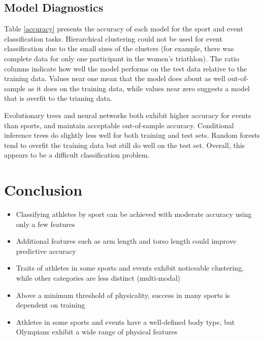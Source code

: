 \documentclass[12pt,letterpaper]{article} %
\begin{document}

\subsection{Model Diagnostics}

Table \ref{accuracy} presents the accuracy of each model for the sport and event classification tasks. Hierarchical clustering could not be used for event classification due to the small sizes of the clusters (for example, there was complete data for only one participant in the women's triathlon). The ratio columns indicate how well the model performs on the test data relative to the training data. Values near one mean that the model does about as well out-of-sample as it does on the training data, while values near zero suggests a model that is overfit to the trianing data.

Evolutionary trees and neural networks both exhibit higher accuracy for events than sports, and maintain acceptable out-of-sample accuracy. Conditional inference trees do slightly less well for both training and test sets. Random forests tend to overfit the training data but still do well on the test set. Overall, this appears to be a difficult classification problem.





\section{Conclusion}

\begin{itemize} 
  \item Classifying athletes by sport can be achieved with moderate accuracy using only a few features
  \item Additional features such as arm length and torso length could improve predictive accuracy
  \item Traits of athletes in some sports and events exhibit noticeable clustering, while other categories are less distinct (multi-modal)
  \item Above a minimum threshold of physicality, success in many sports is dependent on training
  \item Athletes in some sports and events have a well-defined body type, but Olympians exhibit a wide range of physical features
\end{itemize}
\end{document}
